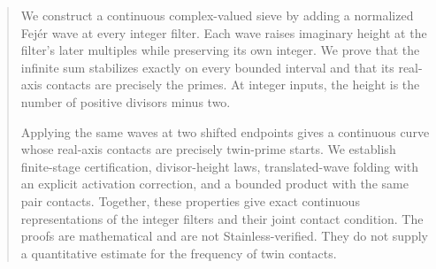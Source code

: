 \begin{abstract}
We construct a continuous complex-valued sieve by adding a normalized
Fejér wave at every integer filter. Each wave raises imaginary height at the
filter's later multiples while preserving its own integer. We prove that the
infinite sum stabilizes exactly on every bounded interval and that its
real-axis contacts are precisely the primes. At integer inputs, the height
is the number of positive divisors minus two.

Applying the same waves at two shifted endpoints gives a continuous curve
whose real-axis contacts are precisely twin-prime starts. We establish
finite-stage certification, divisor-height laws, translated-wave folding
with an explicit activation correction, and a bounded product with the same
pair contacts. Together, these properties give exact continuous
representations of the integer filters and their joint contact condition.
The proofs are mathematical and are not Stainless-verified. They do not
supply a quantitative estimate for the frequency of twin contacts.
\end{abstract}
